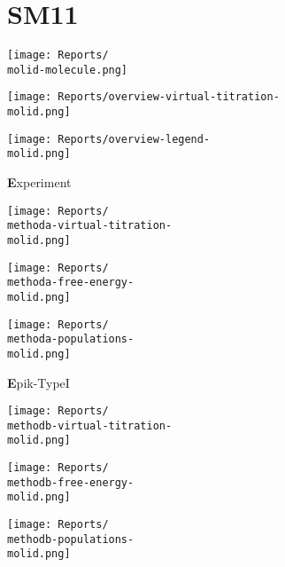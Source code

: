 \documentclass[9pt]{standalone}
\begin{document}
\newcommand{\molid}{SM11}
\newcommand{\methoda}{Experiment}
\newcommand{\methodb}{Epik-TypeI}
\newcommand{\methodc}{Jaguar-TypeI}
\newcommand{\methodd}{Epik-TypeII}
\newcommand{\methode}{Epik-TypeIII}
\section{\molid}
\noindent 
\begin{minipage}[s]{0.35\textwidth}\centering
\texttt{[image: Reports/\\molid-molecule.png]}
\end{minipage}
\begin{minipage}[s]{0.35\textwidth}
\texttt{[image: Reports/overview-virtual-titration-\\molid.png]}
\end{minipage}
\begin{minipage}[s]{0.23\textwidth}
\texttt{[image: Reports/overview-legend-\\molid.png]}
\end{minipage}

\begin{minipage}[s]{\textwidth}\centering
{\textbf \methoda}
\end{minipage}

\noindent
\begin{minipage}[s]{0.33\textwidth}\centering
\texttt{[image: Reports/\\methoda-virtual-titration-\\molid.png]}
\end{minipage}
\begin{minipage}[s]{0.33\textwidth}
\texttt{[image: Reports/\\methoda-free-energy-\\molid.png]}
\end{minipage}
\begin{minipage}[s]{0.33\textwidth}
\texttt{[image: Reports/\\methoda-populations-\\molid.png]}
\end{minipage}

\begin{minipage}[s]{\textwidth}\centering
{\textbf \methodb}
\end{minipage}

\noindent
\begin{minipage}[s]{0.33\textwidth}\centering
\texttt{[image: Reports/\\methodb-virtual-titration-\\molid.png]}
\end{minipage}
\begin{minipage}[s]{0.33\textwidth}
\texttt{[image: Reports/\\methodb-free-energy-\\molid.png]}
\end{minipage}
\begin{minipage}[s]{0.33\textwidth}
\texttt{[image: Reports/\\methodb-populations-\\molid.png]}
\end{minipage}
\end{document}

